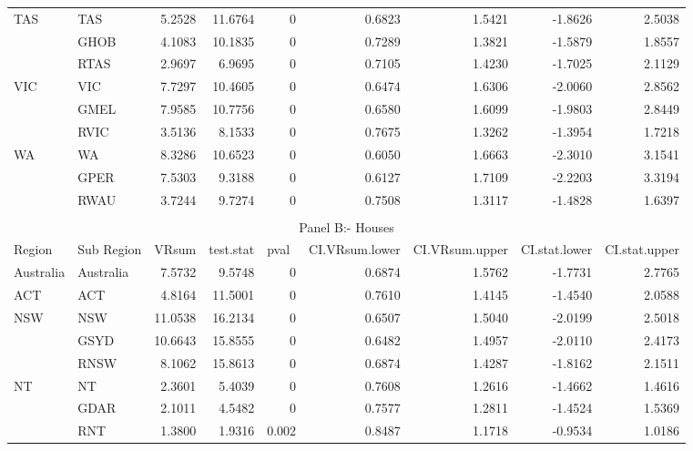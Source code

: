\begin{table}[htbp]
{\begin{tabular}{llrrrrrrr}
    \multirow{3}[0]{*}{TAS} & TAS   & 5.2528 & 11.6764 & 0     & 0.6823 & 1.5421 & -1.8626 & 2.5038 \\
          & GHOB  & 4.1083 & 10.1835 & 0     & 0.7289 & 1.3821 & -1.5879 & 1.8557 \\
          & RTAS  & 2.9697 & 6.9695 & 0     & 0.7105 & 1.4230 & -1.7025 & 2.1129 \\
    \multirow{3}[0]{*}{VIC} & VIC   & 7.7297 & 10.4605 & 0     & 0.6474 & 1.6306 & -2.0060 & 2.8562 \\
          & GMEL  & 7.9585 & 10.7756 & 0     & 0.6580 & 1.6099 & -1.9803 & 2.8449 \\
          & RVIC  & 3.5136 & 8.1533 & 0     & 0.7675 & 1.3262 & -1.3954 & 1.7218 \\
    \multirow{3}[1]{*}{WA} & WA    & 8.3286 & 10.6523 & 0     & 0.6050 & 1.6663 & -2.3010 & 3.1541 \\
          & GPER  & 7.5303 & 9.3188 & 0     & 0.6127 & 1.7109 & -2.2203 & 3.3194 \\
          & RWAU  & 3.7244 & 9.7274 & 0     & 0.7508 & 1.3117 & -1.4828 & 1.6397 \\
    \midrule \\
    \multicolumn{9}{c}{Panel B:- Houses} \\
    \midrule
    Region & Sub Region & \multicolumn{1}{l}{ VRsum} & \multicolumn{1}{l}{ test.stat} & \multicolumn{1}{l}{ pval} & \multicolumn{1}{l}{ CI.VRsum.lower} & \multicolumn{1}{l}{ CI.VRsum.upper} & \multicolumn{1}{l}{ CI.stat.lower} & \multicolumn{1}{l}{ CI.stat.upper} \\
    \midrule
    Australia & Australia & 7.5732 & 9.5748 & 0     & 0.6874 & 1.5762 & -1.7731 & 2.7765 \\
    ACT   & ACT   & 4.8164 & 11.5001 & 0     & 0.7610 & 1.4145 & -1.4540 & 2.0588 \\
    \multirow{3}[0]{*}{NSW} & NSW   & 11.0538 & 16.2134 & 0     & 0.6507 & 1.5040 & -2.0199 & 2.5018 \\
          & GSYD  & 10.6643 & 15.8555 & 0     & 0.6482 & 1.4957 & -2.0110 & 2.4173 \\
          & RNSW  & 8.1062 & 15.8613 & 0     & 0.6874 & 1.4287 & -1.8162 & 2.1511 \\
    \multirow{3}[0]{*}{NT} & NT    & 2.3601 & 5.4039 & 0     & 0.7608 & 1.2616 & -1.4662 & 1.4616 \\
          & GDAR  & 2.1011 & 4.5482 & 0     & 0.7577 & 1.2811 & -1.4524 & 1.5369 \\
          & RNT   & 1.3800 & 1.9316 & 0.002 & 0.8487 & 1.1718 & -0.9534 & 1.0186 \\

\end{tabular}}
\end{table}
